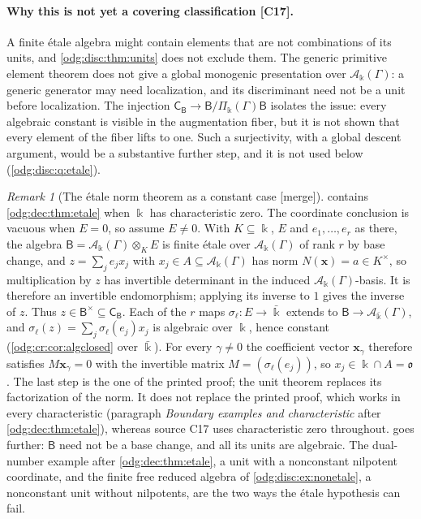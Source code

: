 \documentclass[11pt,oneside]{article}
\numberwithin{equation}{section}
\theoremstyle{definition}
\theoremstyle{remark}
\newtheorem{remark}[remark]{Remark}
\newcommand{\src}[1]{\textup{\textsf{\small[#1]}}}
\newcommand{\mergetag}{\textup{\textsf{\small[merge]}}}
\newcommand{\crA}{\mathcal A_\Bbbk(\Gamma)}
\newcommand{\crP}{\Pi_\Bbbk(\Gamma)}
\begin{document}
\paragraph{Why this is not yet a covering classification \src{C17}.} A finite \'etale
algebra might contain elements that are not combinations of its units, and
\cref{odg:disc:thm:units} does not exclude them. The generic primitive element theorem does
not give a global monogenic presentation over $\crA$: a generic generator may need
localization, and its discriminant need not be a unit before localization. The injection
$\mathsf C_{\mathsf B}\to\mathsf B/\crP\mathsf B$ isolates the issue: every algebraic
constant is visible in the augmentation fiber, but it is not shown that every element of
the fiber lifts to one. Such a surjectivity, with a global descent argument, would be a
substantive further step, and it is not used below (\cref{odg:disc:q:etale}).

\begin{remark}[The \'etale norm theorem as a constant case \mergetag]\label{odg:disc:rem:etalenorm}
 contains \cref{odg:dec:thm:etale} when $\Bbbk$ has
characteristic zero. The coordinate conclusion is vacuous when $E=0$, so assume
$E\ne0$. With $K\subseteq\Bbbk$, $E$ and $e_1,\ldots,e_r$ as there, the algebra
$\mathsf B=\crA\otimes_KE$ is finite \'etale over $\crA$ of rank $r$ by base change, and
$z=\sum_je_jx_j$ with $x_j\in A\subseteq\crA$ has norm $N(\mathbf x)=a\in K^\times$,
so multiplication by $z$ has invertible determinant in the induced $\crA$-basis.
It is therefore an invertible endomorphism; applying its inverse to $1$ gives the
inverse of $z$. Thus $z\in\mathsf B^\times\subseteq\mathsf C_{\mathsf B}$. Each of the $r$
maps $\sigma_\ell:E\to\bar\Bbbk$ extends to $\mathsf B\to\mathcal A_{\bar\Bbbk}(\Gamma)$,
and $\sigma_\ell(z)=\sum_j\sigma_\ell(e_j)x_j$ is algebraic over $\Bbbk$, hence
constant (\cref{odg:cr:cor:algclosed} over $\bar\Bbbk$). For every $\gamma\ne0$ the
coefficient vector $\mathbf x_\gamma$ therefore satisfies $M\mathbf x_\gamma=0$ with the
invertible matrix $M=(\sigma_\ell(e_j))$, so $x_j\in\Bbbk\cap A=\mathfrak o$. The last step
is the one of the printed proof; the unit theorem replaces its factorization of the norm.
It does not replace the printed proof, which works in every characteristic (paragraph
\emph{Boundary examples and characteristic} after \cref{odg:dec:thm:etale}), whereas
source C17 uses characteristic zero throughout.  goes further:
$\mathsf B$ need not be a base change, and all its units are algebraic. The dual-number
example after \cref{odg:dec:thm:etale}, a unit with a nonconstant nilpotent coordinate,
and the finite free reduced algebra of \cref{odg:disc:ex:nonetale}, a nonconstant unit
without nilpotents, are the two ways the \'etale hypothesis can fail.
\end{remark}
\end{document}
